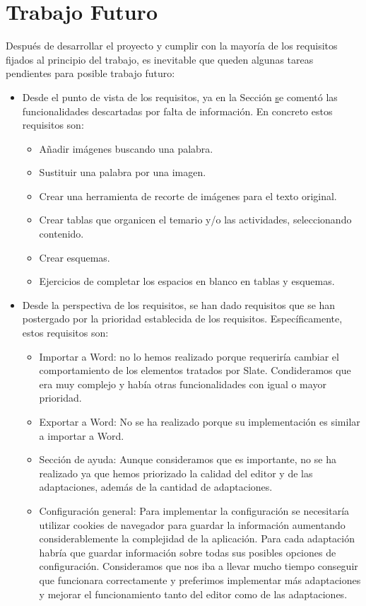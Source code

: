\section{Trabajo Futuro}
\label{sec:TrabajoFuturo}
Después de desarrollar el proyecto y cumplir con la mayoría de los requisitos fijados al principio del trabajo, es inevitable que queden algunas tareas pendientes para posible trabajo futuro:

\begin{itemize}
    \item Desde el punto de vista de los requisitos, ya en la Sección \href{cap:requisitos} se comentó las funcionalidades descartadas por falta de información. En concreto estos requisitos son: 
    \begin{itemize}
        \item Añadir imágenes buscando una palabra.
        \item Sustituir una palabra por una imagen.
        \item Crear una herramienta de recorte de imágenes para el texto original.
        \item Crear tablas que organicen el temario y/o las actividades, seleccionando contenido.
        \item Crear esquemas.
        \item Ejercicios de completar los espacios en blanco en tablas y esquemas.        
    \end{itemize}
    \item Desde la perspectiva de los requisitos, se han dado requisitos que se han postergado por la prioridad establecida de los requisitos. Específicamente, estos requisitos son:
    \begin{itemize}
        \item Importar a Word: no lo hemos realizado porque requeriría cambiar el comportamiento de los elementos tratados por Slate. Condideramos que era muy complejo y había otras funcionalidades con igual o mayor prioridad.
        \item Exportar a Word: No se ha realizado porque su implementación es similar a importar a Word.      
        \item Sección de ayuda: Aunque consideramos que es importante, no se ha realizado ya que hemos priorizado la calidad del editor y de las adaptaciones, además de la cantidad de adaptaciones.
        \item Configuración general: Para implementar la configuración se necesitaría utilizar cookies de navegador para guardar la información aumentando considerablemente la complejidad de la aplicación. Para cada adaptación habría que guardar información sobre todas sus posibles opciones de configuración. Consideramos que nos iba a llevar mucho tiempo conseguir que funcionara correctamente y preferimos implementar más adaptaciones y mejorar el funcionamiento tanto del editor como de las adaptaciones.
    \end{itemize}
\end{itemize}


